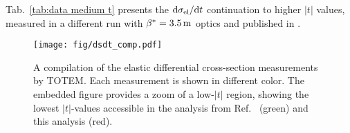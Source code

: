 \documentclass[doublecol]{../macros/epl2}
\def\d{{\rm d}}
\def\un#1{\,{\rm #1}}
\begin{document}
Tab.~\ref{tab:data medium t} presents the $\d\sigma_{\rm el}/\d t$ continuation to higher $|t|$ values, measured in a different run with $\beta^* = 3.5\un{m}$ optics and published in \cite{epl95}.


\begin{figure*}
\begin{center}
\texttt{[image: fig/dsdt\_comp.pdf]}
\vskip-5mm
\caption{A compilation of the elastic differential cross-section measurements by TOTEM. Each measurement is shown in different color. The embedded figure provides a zoom of a low-$|t|$ region, showing the lowest $|t|$-values accessible in the analysis from Ref.~\cite{epl96} (green) and this analysis (red).}
\label{fig:dsdt}
\end{center}
\end{figure*}

\setlength{\tabcolsep}{3.5pt}
\end{document}
